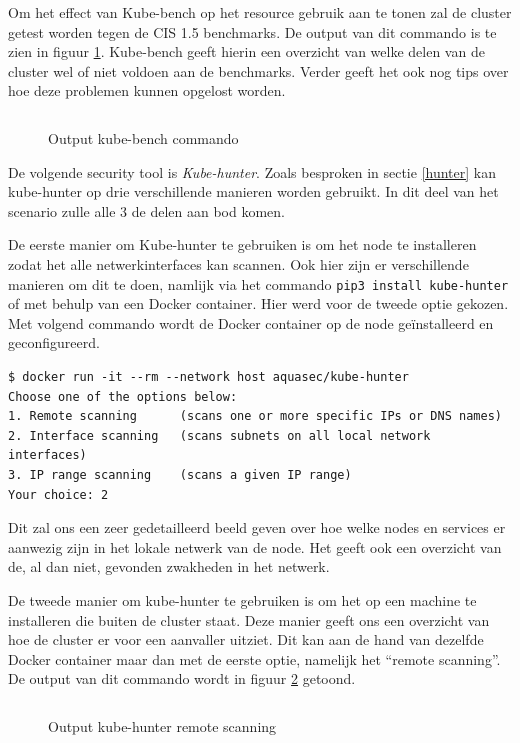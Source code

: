 Om het effect van Kube-bench op het resource gebruik aan te tonen zal de cluster getest worden tegen de CIS 1.5 benchmarks. De output van dit commando is te zien in figuur \ref{benchOut}. Kube-bench geeft hierin een overzicht van welke delen van de cluster wel of niet voldoen aan de benchmarks. Verder geeft het ook nog tips over hoe deze problemen kunnen opgelost worden.

\begin{figure}[h] 
	\centering
	\inputminted[fontsize=\footnotesize,linenos]{bash}{files/benchOutput.txt}
	\caption{Output kube-bench commando}
	\label{benchOut}
\end{figure}

De volgende security tool is \textit{Kube-hunter}. Zoals besproken in sectie \ref{hunter} kan kube-hunter op drie verschillende manieren worden gebruikt. In dit deel van het scenario zulle alle 3 de delen aan bod komen.

De eerste manier om Kube-hunter te gebruiken is om het node te installeren zodat het alle netwerkinterfaces kan scannen. Ook hier zijn er verschillende manieren om dit te doen, namlijk via het commando \verb|pip3 install kube-hunter| of met behulp van een Docker container. Hier werd voor de tweede optie gekozen. Met volgend commando wordt de Docker container op de node geïnstalleerd en geconfigureerd.
\begin{verbatim} 
$ docker run -it --rm --network host aquasec/kube-hunter
Choose one of the options below:
1. Remote scanning      (scans one or more specific IPs or DNS names)
2. Interface scanning   (scans subnets on all local network interfaces)
3. IP range scanning    (scans a given IP range)
Your choice: 2
\end{verbatim}
Dit zal ons een zeer gedetailleerd beeld geven over hoe welke nodes en services er aanwezig zijn in het lokale netwerk van de node. Het geeft ook een overzicht van de, al dan niet, gevonden zwakheden in het netwerk.

De tweede manier om kube-hunter te gebruiken is om het op een machine te installeren die buiten de cluster staat. Deze manier geeft ons een overzicht van hoe de cluster er voor een aanvaller uitziet. Dit kan aan de hand van dezelfde Docker container maar dan met de eerste optie, namelijk het ``remote scanning''. De output van dit commando wordt in figuur \ref{remoteHunt} getoond.

\begin{figure}[h] 
	\centering
	\inputminted[fontsize=\footnotesize,linenos]{bash}{files/hunterRemoteOutput.txt}
	\caption{Output kube-hunter remote scanning}
	\label{remoteHunt}
\end{figure}


